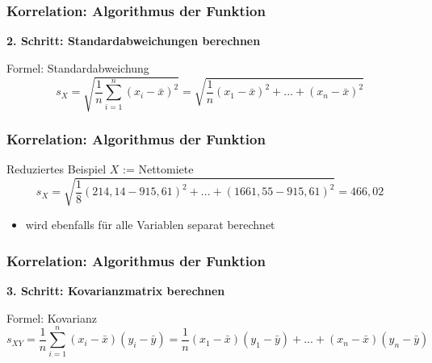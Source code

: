 \documentclass{beamer}
\begin{document}
\begin{frame}
	\frametitle{Korrelation: Algorithmus der Funktion}

	\par \textbf{2. Schritt: Standardabweichungen berechnen}\\[3mm]
	
	\begin{block}{Formel: Standardabweichung}
		\begin{equation*}
			s_X=\sqrt{\dfrac{1}{n}\sum_{i=1}^{n}{(x_i-\bar{x})^2}}=\sqrt{\dfrac{1}{n}(x_1-\bar{x})^2+...+(x_n-\bar{x})^2}
		\end{equation*}
	\end{block}
\end{frame}

\begin{frame}
	\frametitle{Korrelation: Algorithmus der Funktion}

	\begin{block}{Reduziertes Beispiel}
	  $X$ := Nettomiete
		\begin{equation*}
			s_X=\sqrt{\dfrac{1}{8}(214,14-915,61)^2+...+(1661,55-915,61)^2}=466,02
		\end{equation*}
	\end{block}
	
	\begin{itemize}
		\item wird ebenfalls für alle Variablen separat berechnet
	\end{itemize}
\end{frame}

\begin{frame}
	\frametitle{Korrelation: Algorithmus der Funktion}

	\par \textbf{3. Schritt: Kovarianzmatrix berechnen}\\[3mm]
	
	\begin{block}{Formel: Kovarianz}
		\begin{equation*}
			s_{XY}=\dfrac{1}{n}\sum_{i=1}^{n}{(x_i-\bar{x})(y_i-\bar{y})}=\dfrac{1}{n}(x_1-\bar{x})(y_1-\bar{y})+...+(x_n-\bar{x})(y_n-\bar{y})
		\end{equation*}
	\end{block}
\end{frame}
\end{document}
